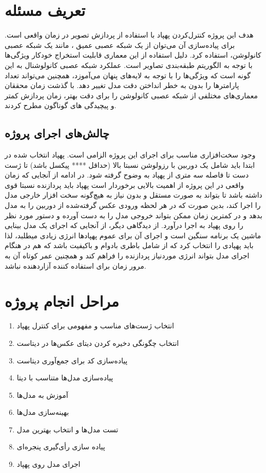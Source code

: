 \section{تعریف مسئله}
هدف این پروژه کنترل‌کردن پهپاد با استفاده از پردازش تصویر در زمان واقعی است. برای پیاده‌سازی آن می‌توان از یک شبکه عصبی عمیق 
، مانند یک شبکه عصبی کانولوشن، استفاده کرد. دلیل استفاده از این معماری قابلیت استخراج خودکار ویژگی‌ها با توجه به الگوریتم طبقه‌بندی تصاویر
است. عملکرد شبکه عصبی کانولوشنال به این گونه است که ویژگی‌ها را با توجه به لایه‌های پنهان می‌آموزد، همچنین می‌تواند تعداد پارامترها را بدون به خطر انداختن دقت مدل تغییر دهد. با گذشت زمان محققان 
معماری‌های مختلفی از شبکه عصبی کانولوشن را برای دقت بهتر، زمان پردازش کمتر و پیچیدگی های  گوناگون مطرح کردند. 

\subsection{چالش‌های اجرای پروژه}
وجود سخت‌افزاری مناسب برای اجرای این پروژه الزامی است. پهپاد انتخاب شده در ابتدا باید شامل یک دوربین با رزولوشن نسبتا بالا (حداقل **** پیکسل باشد) تا  ژست دست تا فاصله سه متری از پهپاد به وضوح گرفته شود.
در ادامه از آنجایی که زمان واقعی در این پروژه از اهمیت بالایی برخوردار است پهپاد باید پردازنده نسبتا قوی داشته باشد تا بتواند به صورت مستقل و بدون نیاز به هیچ‌گونه سخت افزار خارجی مدل را اجرا کند، 
بدین صورت که در هر لحظه ورودی عکس گرفته‌شده از دوربین را به مدل بدهد و در کمترین زمان ممکن بتواند خروجی مدل را به دست آورده و دستور مورد نظر را روی 
پهپاد به اجرا درآورد. از دیدگاهی دیگر، از آنجایی که اجرای یک مدل بینایی ماشین یک برنامه سنگین است و اجرای آن برای عموم پهپاد‌ها انرژی زیادی میطلبد، لذا باید پهپادی را انتخاب کرد
که از شامل باطری بادوام و باکیفیت باشد که هم در هنگام اجرای مدل بتواند انرژی مورد‌نیاز پردازنده را فراهم کند و همچنین عمر کوتاه آن به مرور زمان برای استفاده کننده آزاردهنده نباشد.



\section{مراحل انجام پروژه}
\begin{enumerate}
    \item  انتخاب ژست‌های مناسب و مفهومی برای کنترل پهپاد
    \item  انتخاب چگونگی دخیره کردن دیتای عکس‌ها در دیتاست
    \item  پیاده‌سازی کد برای جمع‌آوری دیتاست
    \item  پیاده‌سازی مدل‌ها متناسب با دیتا
    \item  آموزش به مدل‌ها
    \item  بهینه‌سازی مدل‌ها
    \item  تست مدل‌ها و انتخاب بهترین مدل
    \item  پیاده سازی رأی‌گیری پنجره‌ای
    \item  اجرای مدل روی پهپاد
\end{enumerate}
 

